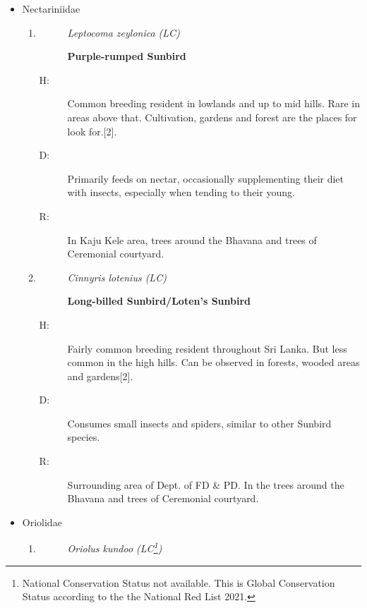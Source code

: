 \begin{itemize}
\begin{enumerate}
\end{enumerate}%
\item%
Nectariniidae%
\begin{enumerate}%
\item%
\begin{description}%
\item[]%
\textit{Leptocoma zeylonica (LC)}%
\item[]%
\textbf{Purple{-}rumped Sunbird}%
\end{description}%
\begin{description}%
\item[H: ]%
Common breeding resident in lowlands and up to mid hills. Rare in areas above that. Cultivation, gardens and forest are the places for look for.{[}2{]}.%
\item[D: ]%
Primarily feeds on nectar, occasionally supplementing their diet with insects, especially when tending to their young.%
\item[R: ]%
In Kaju Kele area, trees around the Bhavana and trees of Ceremonial courtyard. %
\end{description}%
\item%
\begin{description}%
\item[]%
\textit{Cinnyris lotenius (LC)}%
\item[]%
\textbf{Long{-}billed Sunbird/Loten's Sunbird}%
\end{description}%
\begin{description}%
\item[H: ]%
Fairly common breeding resident throughout Sri Lanka. But less common in the high hills. Can be observed in forests, wooded areas and gardens{[}2{]}.%
\item[D: ]%
Consumes small insects and spiders, similar to other Sunbird species.%
\item[R: ]%
Surrounding area of Dept. of FD \& PD. In the trees around the Bhavana and trees of Ceremonial courtyard.%
\end{description}%
\end{enumerate}%
\item%
Oriolidae%
\begin{enumerate}%
\item%
\begin{description}%
\item[]%
\textit{Oriolus kundoo (LC\footnote{National Conservation Status not available. This is Global Conservation Status according to the the National Red List 2021.})}%
\item[]%

\end{description}
\end{enumerate}
\end{itemize}
